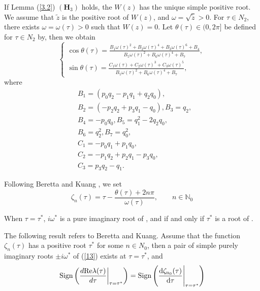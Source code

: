 \documentclass{CMHPhD-SIVD}
\begin{document}

If Lemma (\ref{3.2}) $(\mathbf{H}_3)$ holds, the $W(z)$ has the unique simple positive root. We assume that $\tilde{z}$ is the positive root of $W(z)$, and $\omega=\sqrt{\tilde{z}}>0$.  For $\tau \in N_2$, there exists $\omega = \omega(\tau) > 0$ such that $W(z) = 0$. Let $\theta(\tau)\in(0, 2\pi]$ be defined for $\tau\in N_2$ by, then we obtain
\begin{equation}\label{20}
\left\{
   \begin{array}{ll}
    \cos \theta(\tau)=\frac{B_1 \omega(\tau)^2 + B_2 \omega(\tau)^4 + B_3 \omega(\tau)^6 + B_4}{B_5 \omega(\tau)^2 + B_6 \omega(\tau)^4 + B_7},\\
    \sin \theta(\tau)=\frac{C_1 \omega(\tau) + C_2 \omega(\tau)^3 + C_3 \omega(\tau)^5}{B_5 \omega(\tau)^2 + B_6 \omega(\tau)^4 + B_7},
   \end{array}
\right.
\end{equation}
where
\begin{align*}
&B_1 = (p_0 q_2 -p_1 q_1 +q_2 q_0),\\
&B_2 = (-p_2 q_2 +p_3 q_1 -q_0), B_3 = q_2,\\
&B_4 = -p_0 q_0,B_5 = q_1^2 - 2q_2 q_0,\\
&B_6 =q_2^2,B_7 = q_0^2,\\
&C_1 = -p_0 q_1 + p_1 q_0,\\
&C_2 = -p_1 q_2 + p_2 q_1 - p_3 q_0,\\
&C_3 = p_3 q_2 - q_1.
\end{align*}



Following Beretta and Kuang \cite{beretta2002geometric}, we set
\begin{equation}\label{21}
\zeta_n(\tau)=\tau-\frac{\theta(\tau)+2n\pi}{\omega(\tau)}, \qquad n\in \mathbb{N}_0
\end{equation}

When $\tau=\tau^*$, $i \omega^*$ is a pure imaginary root of , and if and only if $\tau^*$ is a root of .

The following result refers to Beretta and Kuang.
Assume that the function $\zeta_n(\tau)$ has a positive root $\tau^*$ for some $n\in N_0$, then a pair of simple purely imaginary roots $\pm i \omega^*$ of (\ref{13}) exists at $\tau= \tau^*$, and
\begin{equation}\label{22}
	\left.\operatorname{Sign}\left(\frac{d {\rm Re \lambda(\tau)}}{d\tau}\right|_{\tau=\tau^*}\right)=\rm \operatorname{Sign}\left(\frac{{\rm d} \zeta_{n_0}(\tau)}{d\tau}\Bigg|_{\tau=\tau^*}\right)
\end{equation}
\end{document}
